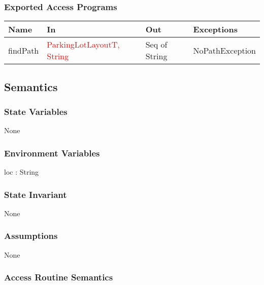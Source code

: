 \documentclass[12pt, titlepage]{article}
\begin{document}
\subsubsection{Exported Access Programs}

\begin{tabular}{l l l l}
\hline
\textbf{Name} & \textbf{In} & \textbf{Out} & \textbf{Exceptions} \\
\hline
findPath & \textcolor{red}{ParkingLotLayoutT, String} & Seq of String &
NoPathException\\
\hline
\end{tabular}

\subsection{Semantics}

\subsubsection{State Variables}
None

\subsubsection{Environment Variables}
loc : String

\subsubsection{State Invariant}
None

\subsubsection{Assumptions}
None

\subsubsection{Access Routine Semantics}
\end{document}
